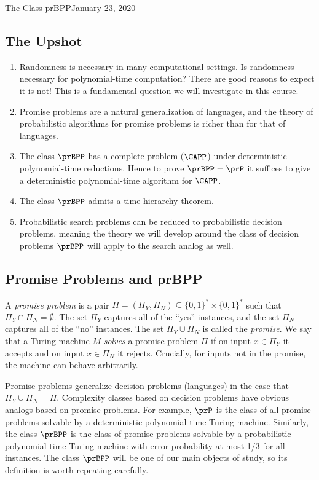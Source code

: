 \begin{lecture}{1}{The Class prBPP}{January 23, 2020}
\label{lec:01}

\subsection*{The Upshot}

\begin{enumerate}
  \item Randomness is necessary in many computational settings. Is randomness
    necessary for polynomial-time computation? There are good reasons to expect
    it is not! This is a fundamental question we will investigate in this
    course.
  \item Promise problems are a natural generalization of languages, and the
    theory of probabilistic algorithms for promise problems is richer than
    for that of languages.
  \item The class $\prBPP$ has a complete problem ($\CAPP$) under deterministic
    polynomial-time reductions. Hence to prove $\prBPP = \prP$ it suffices
    to give a deterministic polynomial-time algorithm for $\CAPP$.
  \item The class $\prBPP$ admits a time-hierarchy theorem.
  \item Probabilistic search problems can be reduced to probabilistic decision
    problems, meaning the theory we will develop around the class of decision
    problems $\prBPP$ will apply to the search analog as well.
\end{enumerate}

\subsection{Promise Problems and prBPP}

A \emph{promise problem} is a pair $\Pi = (\Pi_Y, \Pi_N) \subseteq \{0, 1\}^*
\times \{0, 1\}^*$ such that $\Pi_Y \cap \Pi_N = \emptyset$. The set $\Pi_Y$
captures all of the ``yes'' instances, and the set $\Pi_N$ captures all of the
``no'' instances. The set $\Pi_Y \cup \Pi_N$ is called the \emph{promise}. We
say that a Turing machine $M$ \emph{solves} a promise problem $\Pi$ if on
input $x \in \Pi_Y$ it accepts and on input $x \in \Pi_N$ it rejects. Crucially,
for inputs not in the promise, the machine can behave arbitrarily.

Promise problems generalize decision problems (languages) in the case that
$\Pi_Y \cup \Pi_N = \Pi$. 
Complexity classes based on decision problems have
obvious analogs based on promise problems. For example, $\prP$ is the class of
all promise problems solvable by a deterministic polynomial-time Turing
machine. Similarly, the class $\prBPP$ is the class of promise problems solvable
by a probabilistic polynomial-time Turing machine with error probability at
most 1/3 for all instances. 
The class $\prBPP$ will be one of our main objects of study, so its definition
is worth repeating carefully.


\end{lecture}
